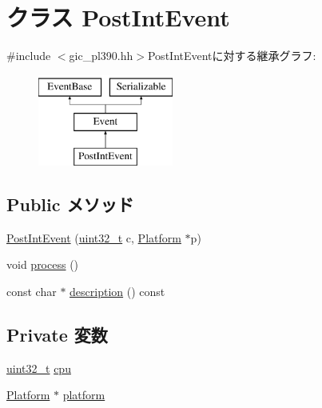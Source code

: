 \hypertarget{classPl390_1_1PostIntEvent}{
\section{クラス PostIntEvent}
\label{classPl390_1_1PostIntEvent}
}


{\ttfamily \#include $<$gic\_\-pl390.hh$>$}PostIntEventに対する継承グラフ:\begin{figure}[H]
\begin{center}
\leavevmode
\includegraphics[height=3cm]{classPl390_1_1PostIntEvent}
\end{center}
\end{figure}
\subsection*{Public メソッド}
\begin{DoxyCompactItemize}
\item 
\hyperlink{classPl390_1_1PostIntEvent_a1d50f56c27c573352972378ca859ef13}{PostIntEvent} (\hyperlink{Type_8hh_a435d1572bf3f880d55459d9805097f62}{uint32\_\-t} c, \hyperlink{classPlatform}{Platform} $\ast$p)
\item 
void \hyperlink{classPl390_1_1PostIntEvent_a2e9c5136d19b1a95fc427e0852deab5c}{process} ()
\item 
const char $\ast$ \hyperlink{classPl390_1_1PostIntEvent_a2bd90422eece9190794479e08092a252}{description} () const 
\end{DoxyCompactItemize}
\subsection*{Private 変数}
\begin{DoxyCompactItemize}
\item 
\hyperlink{Type_8hh_a435d1572bf3f880d55459d9805097f62}{uint32\_\-t} \hyperlink{classPl390_1_1PostIntEvent_a5af5cfc775318915ba91bd706254f4db}{cpu}
\item 
\hyperlink{classPlatform}{Platform} $\ast$ \hyperlink{classPl390_1_1PostIntEvent_a75b48f1787959a4617f2a599d7c09aab}{platform}
\end{DoxyCompactItemize}



